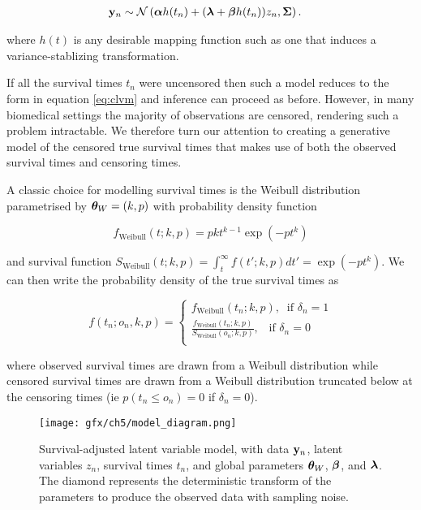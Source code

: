 \begin{equation}
  \begin{aligned}
\mathbf{y}_n & \sim \mathcal{N}\left( \bm{\alpha} h(t_n) + (\bm{\lambda} + \bm{\beta} h(t_n)) z_n, \bm{\Sigma} \right).
  \end{aligned}
\end{equation}

where $h(t)$ is any desirable mapping function such as one that induces a variance-stablizing transformation.

If all the survival times $t_n$ were uncensored then such a model reduces to the form in equation \ref{eq:clvm} and inference can proceed as before. However, in many biomedical settings the majority of observations are censored, rendering such a problem intractable. We therefore turn our attention to creating a generative model of the censored true survival times that makes use of both the observed survival times and censoring times. %

A classic choice for modelling survival times is the Weibull distribution parametrised by $\bm{\theta}_W = (k,p)$ with probability density function

\begin{equation}
  f_{\text{Weibull}}(t; k,p) = pkt^{k-1} \exp(-pt^k)
\end{equation}

and survival function $S_{\text{Weibull}}(t; k, p) = \int_t^\infty f(t'; k, p) dt' = \exp(-pt^k)$. We can then write the probability density of the true survival times as

\begin{equation}
  f(t_n; o_n, k, p) =
  \begin{cases}
    f_{\text{Weibull}}(t_n; k, p), \; \; \text{if $\delta_n = 1$} \\
    \frac{f_{\text{Weibull}}(t_n; k, p)}{S_{\text{Weibull}}(o_n; k, p)}, \; \; \; \text{if $\delta_n = 0$} \\
  \end{cases}
\end{equation}

where observed survival times are drawn from a Weibull distribution while censored survival times are drawn from a Weibull distribution truncated below at the censoring times (ie $p(t_n \leq o_n) = 0$ if $\delta_n = 0$).

\begin{figure}
  \centering
\texttt{[image: gfx/ch5/model\_diagram.png]}
\caption{Survival-adjusted latent variable model, with data $\mathbf{y}_n$, latent variables $z_n$, survival times $t_n$, and global parameters $\bm{\theta}_W$, $\bm{\beta}$, and $\bm{\lambda}$. The diamond represents the deterministic transform of the parameters to produce the observed data with sampling noise.} \label{fig:model}
\end{figure}

